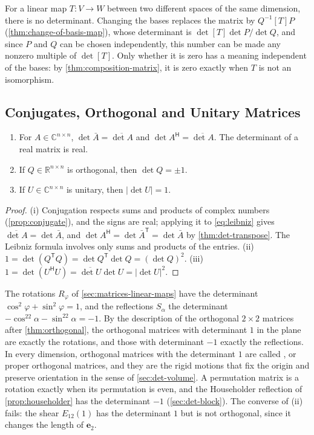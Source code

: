For a linear map $T\colon V\to W$ between two different spaces of the same dimension, there is no determinant. Changing the bases replaces the matrix by $Q^{-1}[T]P$ (\cref{thm:change-of-basis-map}), whose determinant is $\det[T]\det P/\det Q$, and since $P$ and $Q$ can be chosen independently, this number can be made any nonzero multiple of $\det[T]$. Only whether it is zero has a meaning independent of the bases: by \cref{thm:composition-matrix}, it is zero exactly when $T$ is not an isomorphism.

\subsection{Conjugates, Orthogonal and Unitary Matrices}

\begin{proposition}
\label{prop:det-unitary}
\leavevmode
\begin{enumerate}
\item For $A\in\mathbb C^{n\times n}$, $\det\bar A=\overline{\det A}$ and $\det A^{\mathsf H}=\overline{\det A}$. The determinant of a real matrix is real.
\item If $Q\in\mathbb R^{n\times n}$ is orthogonal, then $\det Q=\pm1$.
\item If $U\in\mathbb C^{n\times n}$ is unitary, then $|\det U|=1$.
\end{enumerate}
\end{proposition}

\begin{proof}
(i) Conjugation respects sums and products of complex numbers (\cref{prop:conjugate}), and the signs are real; applying it to \eqref{eq:leibniz} gives $\overline{\det A}=\det\bar A$, and $\det A^{\mathsf H}=\det\bar A^{\mathsf T}=\det\bar A$ by \cref{thm:det-transpose}. The Leibniz formula involves only sums and products of the entries. (ii) $1=\det(Q^{\mathsf T}Q)=\det Q^{\mathsf T}\det Q=(\det Q)^2$. (iii) $1=\det(U^{\mathsf H}U)=\overline{\det U}\det U=|\det U|^2$.
\end{proof}

The rotations $R_\varphi$ of \cref{sec:matrices-linear-maps} have the determinant $\cos^2\varphi+\sin^2\varphi=1$, and the reflections $S_\alpha$ the determinant $-\cos^22\alpha-\sin^22\alpha=-1$. By the description of the orthogonal $2\times2$ matrices after \cref{thm:orthogonal}, the orthogonal matrices with determinant $1$ in the plane are exactly the rotations, and those with determinant $-1$ exactly the reflections. In every dimension, orthogonal matrices with the determinant $1$ are called , or proper orthogonal matrices, and they are the rigid motions that fix the origin and preserve orientation in the sense of \cref{sec:det-volume}. A permutation matrix is a rotation exactly when its permutation is even, and the Householder reflection of \cref{prop:householder} has the determinant $-1$ (\cref{sec:det-block}). The converse of (ii) fails: the shear $E_{12}(1)$ has the determinant $1$ but is not orthogonal, since it changes the length of $\mathbf e_2$.

